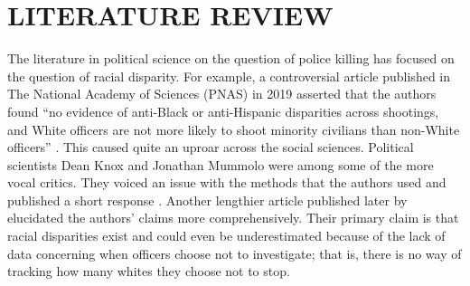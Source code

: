 \documentclass[12pt]{article}
\begin{document}



\section{LITERATURE REVIEW}

The literature in political science on the question of police killing has focused on the question of racial disparity. For example, a controversial article published in The National Academy of Sciences (PNAS) in 2019 asserted that the authors found “no evidence of anti-Black or anti-Hispanic disparities across shootings, and White officers are not more likely to shoot minority civilians than non-White officers” \parencite[15877]{johnsonOfficerCharacteristicsRacial2019}. This caused quite an uproar across the social sciences. Political scientists Dean Knox and Jonathan Mummolo were among some of the more vocal critics. They voiced an issue with the methods that the authors used and published a short response \parencite{knoxMakingInferencesRacial2020}. Another lengthier article published later by \textcite{knoxAdministrativeRecordsMask2020} elucidated the authors’ claims more comprehensively. Their primary claim is that racial disparities exist and could even be underestimated because of the lack of data concerning when officers choose not to investigate; that is, there is no way of tracking how many whites they choose not to stop.
\end{document}
